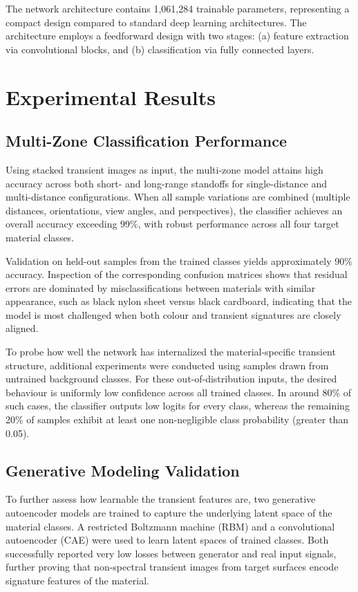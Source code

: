 \documentclass[10pt,twocolumn]{article}
\begin{document}
The network architecture contains 1,061,284 trainable parameters, representing a compact design compared to standard deep learning architectures. The architecture employs a feedforward design with two stages: (a) feature extraction via convolutional blocks, and (b) classification via fully connected layers.

\section{Experimental Results}

\subsection{Multi-Zone Classification Performance}

Using stacked transient images as input, the multi-zone model attains high accuracy across both short- and long-range standoffs for single-distance and multi-distance configurations. When all sample variations are combined (multiple distances, orientations, view angles, and perspectives), the classifier achieves an overall accuracy exceeding 99\%, with robust performance across all four target material classes.

Validation on held-out samples from the trained classes yields approximately 90\% accuracy. Inspection of the corresponding confusion matrices shows that residual errors are dominated by misclassifications between materials with similar appearance, such as black nylon sheet versus black cardboard, indicating that the model is most challenged when both colour and transient signatures are closely aligned.

To probe how well the network has internalized the material-specific transient structure, additional experiments were conducted using samples drawn from untrained background classes. For these out-of-distribution inputs, the desired behaviour is uniformly low confidence across all trained classes. In around 80\% of such cases, the classifier outputs low logits for every class, whereas the remaining 20\% of samples exhibit at least one non-negligible class probability (greater than 0.05).

\subsection{Generative Modeling Validation}

To further assess how learnable the transient features are, two generative autoencoder models are trained to capture the underlying latent space of the material classes. A restricted Boltzmann machine (RBM) and a convolutional autoencoder (CAE) were used to learn latent spaces of trained classes. Both successfully reported very low losses between generator and real input signals, further proving that non-spectral transient images from target surfaces encode signature features of the material.
\end{document}
